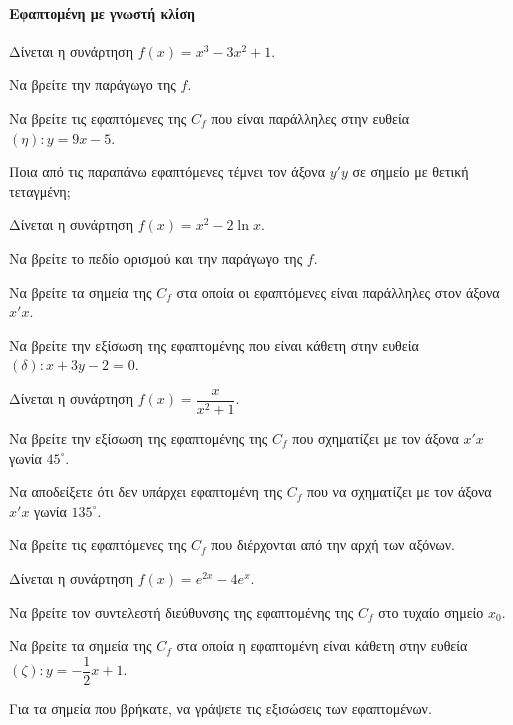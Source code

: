 \documentclass[11pt,a4paper,modern]{FFExercises}
\begin{document}
\paragraph{Εφαπτομένη με γνωστή κλίση}
\askhsh
Δίνεται η συνάρτηση $ f(x)=x^3-3x^2+1 $.
\begin{alist}
    \item Να βρείτε την παράγωγο της $ f $.
    \item Να βρείτε τις εφαπτόμενες της $ C_f $ που είναι παράλληλες στην ευθεία $ (\eta): y=9x-5 $.
    \item Ποια από τις παραπάνω εφαπτόμενες τέμνει τον άξονα $ y'y $ σε σημείο με θετική τεταγμένη;
\end{alist}

\askhsh
Δίνεται η συνάρτηση $ f(x)=x^2-2\ln x $.
\begin{alist}
    \item Να βρείτε το πεδίο ορισμού και την παράγωγο της $ f $.
    \item Να βρείτε τα σημεία της $ C_f $ στα οποία οι εφαπτόμενες είναι παράλληλες στον άξονα $ x'x $.
    \item Να βρείτε την εξίσωση της εφαπτομένης που είναι κάθετη στην ευθεία $ (\delta): x+3y-2=0 $.
\end{alist}

\askhsh
Δίνεται η συνάρτηση $ f(x)=\dfrac{x}{x^2+1} $.
\begin{alist}
    \item Να βρείτε την εξίσωση της εφαπτομένης της $ C_f $ που σχηματίζει με τον άξονα $ x'x $ γωνία $ 45^\circ $.
    \item Να αποδείξετε ότι δεν υπάρχει εφαπτομένη της $ C_f $ που να σχηματίζει με τον άξονα $ x'x $ γωνία $ 135^\circ $.
    \item Να βρείτε τις εφαπτόμενες της $ C_f $ που διέρχονται από την αρχή των αξόνων.
\end{alist}

\askhsh
Δίνεται η συνάρτηση $ f(x)=e^{2x}-4e^x $.
\begin{alist}
    \item Να βρείτε τον συντελεστή διεύθυνσης της εφαπτομένης της $ C_f $ στο τυχαίο σημείο $ x_0 $.
    \item Να βρείτε τα σημεία της $ C_f $ στα οποία η εφαπτομένη είναι κάθετη στην ευθεία $ (\zeta): y=-\dfrac{1}{2}x+1 $.
    \item Για τα σημεία που βρήκατε, να γράψετε τις εξισώσεις των εφαπτομένων.
\end{alist}
\end{document}
